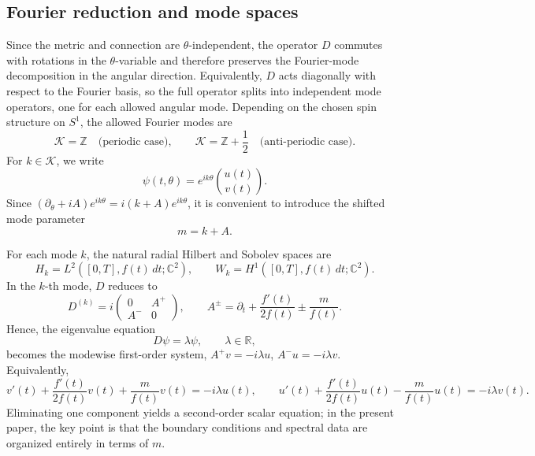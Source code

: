 \documentclass[11pt]{article}
\theoremstyle{definition}
\numberwithin{equation}{section}
\begin{document}
\subsection{Fourier reduction and mode spaces}

Since the metric and connection are \(\theta\)-independent, the operator \(D\) commutes with rotations in the \(\theta\)-variable and therefore preserves the Fourier-mode decomposition in the angular direction. Equivalently, \(D\) acts diagonally with respect to the Fourier basis, so the full operator splits into independent mode operators, one for each allowed angular mode. Depending on the chosen spin structure on \(S^1\), the allowed Fourier modes are
\begin{equation}\label{eq:Kdef}
\mathcal K=\mathbb Z
\quad\text{(periodic case)},
\qquad
\mathcal K=\mathbb Z+\frac12
\quad\text{(anti-periodic case)}.
\end{equation}
For \(k\in\mathcal K\), we write
\begin{equation}\label{eq:fourier_ansatz}
\psi(t,\theta)=e^{ik\theta}\binom{u(t)}{v(t)}.
\end{equation}
Since \((\partial_\theta+iA)e^{ik\theta} = i(k+A)e^{ik\theta}\), it is convenient to introduce the shifted mode parameter
\begin{equation}\label{eq:mdef}
m=k+A.
\end{equation}

For each mode \(k\), the natural radial Hilbert and Sobolev spaces are
\begin{equation}\label{eq:mode_spaces}
H_k=L^2([0,T],f(t)\,dt;\mathbb C^2),
\qquad
W_k=H^1([0,T],f(t)\,dt;\mathbb C^2).
\end{equation}
In the \(k\)-th mode, \(D\) reduces to 
\begin{equation}\label{eq:Dk}
D^{(k)}
=
i
\begin{pmatrix}
0 & A^+\\
A^- & 0
\end{pmatrix},\qquad
A^\pm=\partial_t+\frac{f'(t)}{2f(t)}\pm \frac{m}{f(t)}.
\end{equation}
Hence, the eigenvalue equation
\begin{equation}\label{eq:eigen_eq}
D\psi=\lambda\psi,
\qquad
\lambda\in\mathbb R,
\end{equation}
becomes the modewise first-order system, \(A^+v=-i\lambda u\), \(A^-u=-i\lambda v\). 
Equivalently,
\begin{equation}\label{eq:mode_system_components}
v'(t)+\frac{f'(t)}{2f(t)}v(t)+\frac{m}{f(t)}v(t)=-i\lambda u(t),
\qquad
u'(t)+\frac{f'(t)}{2f(t)}u(t)-\frac{m}{f(t)}u(t)=-i\lambda v(t).
\end{equation}
Eliminating one component yields a second-order scalar equation; in the present paper, the key point is that the boundary conditions and spectral data are organized entirely in terms of \(m\).
\end{document}
